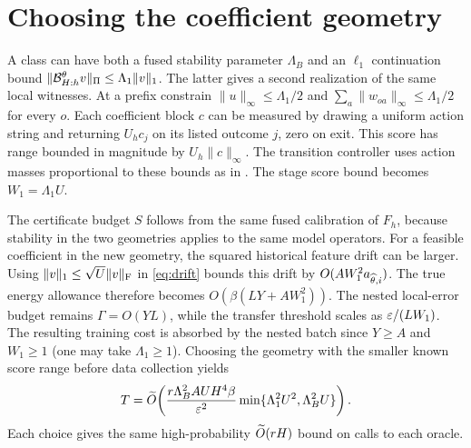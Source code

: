 \section{Choosing the coefficient geometry}
A class can have both a fused stability parameter $\Lambda_B$ and an $\ell_1$ continuation bound $\lVert \mathcal B^\theta_{H:h}v\rVert_{\Pi}\le\Lambda_1\|v\|_1$. The latter gives a second realization of the same local witnesses. At a prefix constrain $\|u\|_\infty\le\Lambda_1/2$ and $\sum_a\|w_{oa}\|_\infty\le\Lambda_1/2$ for every $o$. Each coefficient block $c$ can be measured by drawing a uniform action string and returning $U_h c_j$ on its listed outcome $j$, zero on exit. This score has range bounded in magnitude by $U_h\|c\|_\infty$. The transition controller uses action masses proportional to these bounds as in . The stage score bound becomes $W_1=\Lambda_1U$.

The certificate budget $S$ follows from the same fused calibration of $F_h$, because stability in the two geometries applies to the same model operators. For a feasible coefficient in the new geometry, the squared historical feature drift can be larger. Using $\|v\|_1\le\sqrt U\lVert v\rVert_{\mathrm F}$ in \eqref{eq:drift} bounds this drift by $O(AW_1^2 a_{\widehat\theta,i})$. The true energy allowance therefore becomes $O(\beta(LY+AW_1^2))$. The nested local-error budget remains $\Gamma=O(YL)$, while the transfer threshold scales as $\varepsilon/(LW_1)$. The resulting training cost is absorbed by the nested batch since $Y\ge A$ and $W_1\ge1$ (one may take $\Lambda_1\ge1$). Choosing the geometry with the smaller known score range before data collection yields
\[
 T=\widetilde O\!\left(\frac{r\Lambda_B^2 AU H^4\beta}{\varepsilon^2}
       \min\{\Lambda_1^2 U^2,\Lambda_B^2 U\}\right).
\]
Each choice gives the same high-probability $\widetilde O(rH)$ bound on calls to each oracle.
